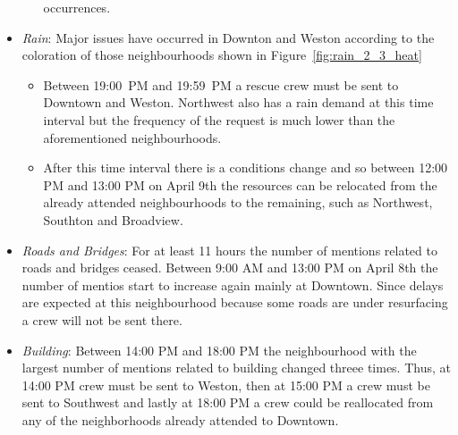 \begin{itemize}
\begin{itemize}
        occurrences.
    \end{itemize}                                                           
    \smallskip                                                                   
    \item \emph{Rain}: Major issues have occurred in Downton and Weston
    according to the coloration of those neighbourhoods shown in 
    Figure~\ref{fig:rain_2_3_heat}                             
    \begin{itemize}                                                              
        \item Between 19:00~PM and 19:59~PM a rescue crew must be sent to 
        Downtown and Weston. Northwest also has a rain demand at this time 
        interval but the frequency of the request is much lower than the 
        aforementioned neighbourhoods. 
        \item After this time interval there is a conditions change and so
        between 12:00 PM and 13:00 PM on April 9th the resources can be
        relocated from the already attended neighbourhoods to the remaining,
        such as Northwest, Southton and Broadview.
     \end{itemize}                                                                
    \item \emph{Roads and Bridges}: For at least 11 hours the number of 
    mentions related to roads and bridges ceased. Between 9:00 AM and 13:00 PM
    on April 8th the number of mentios start to increase again mainly at 
    Downtown. Since delays are expected at this neighbourhood because some roads 
    are under resurfacing a crew  will not be sent there. 
    \item \emph{Building}: Between 14:00 PM and 18:00 PM the neighbourhood with
    the largest number of mentions related to building changed threee times. 
    Thus, at 14:00 PM crew must be sent to Weston, then at 15:00 PM a crew must
    be sent to Southwest and lastly at 18:00 PM a crew could be reallocated from
    any of the neighborhoods already attended to Downtown.  
\end{itemize}

